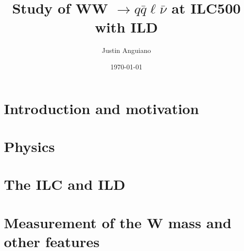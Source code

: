 \documentclass[%
 amsmath,amssymb,
 aps,
 prc
]{revtex4-1}
\begin{document}
\title{Study of WW $\rightarrow q\bar{q}\ell\bar{\nu}$ at ILC500 with ILD }
\author{Justin Anguiano}
\date{\today}


\begin{abstract}

\end{abstract}


\maketitle


\section{Introduction and motivation}
\label{sec:Introduction}
%

\section{Physics}
\label{sec:physics}





\section{The ILC and ILD}
\label{sec:ILC_detector}



\section{Measurement of the W mass and other features}
\label{Current_Work} 

\end{document}
